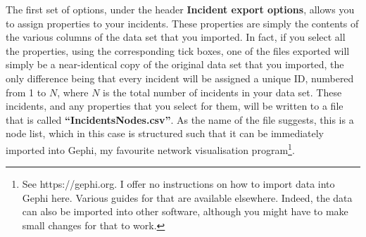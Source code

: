 \documentclass{memoir}
\begin{document}
The first set of options, under the header \textbf{Incident export options}, allows you to assign properties to your incidents. These properties are simply the contents of the various columns of the data set that you imported. In fact, if you select all the properties, using the corresponding tick boxes, one of the files exported will simply be a near-identical copy of the original data set that you imported, the only difference being that every incident will be assigned a unique ID, numbered from 1 to \(N\), where \(N\) is the total number of incidents in your data set. These incidents, and any properties that you select for them, will be written to a file that is called \textbf{``Incidents\textunderscore Nodes.csv''}. As the name of the file suggests, this is a node list, which in this case is structured such that it can be immediately imported into Gephi, my favourite network visualisation program\footnote{See https://gephi.org. I offer no instructions on how to import data into Gephi here. Various guides for that are available elsewhere. Indeed, the data can also be imported into other software, although you might have to make small changes for that to work.}. 
\end{document}
